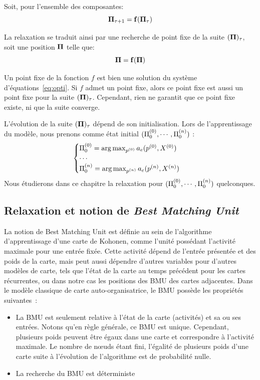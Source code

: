 \documentclass[../main]{subfiles}
\begin{document}
Soit, pour l'ensemble des composantes: 
\begin{equation}
\mathbf{\Pi}_{\tau+1} = \mathbf{f}(\mathbf{\Pi}_\tau)
\end{equation}

La relaxation se traduit ainsi par une recherche de point fixe de la suite $(\mathbf{\Pi})_{\tau}$, soit une position $\mathbf{\Pi}$ telle que:
\begin{equation}
\mathbf{\Pi} = \mathbf{f}(\mathbf{\Pi})
\label{eq:suite}
\end{equation}

Un point fixe de la fonction $f$ est bien une solution du système d'équations~\ref{eq:opti}.
Si $f$ admet un point fixe, alors ce point fixe est aussi un point fixe pour la suite $(\mathbf{\Pi})_\tau$. Cependant, rien ne garantit que ce point fixe existe, ni que la suite converge.

L'évolution de la suite $(\mathbf{\Pi})_{\tau}$ dépend de son initialisation.
Lors de l'apprentissage du modèle, nous prenons comme état initial $(\Pi^{({0})}_0, \cdots , \Pi^{({n})}_0)$ : 
\begin{equation}
\begin{cases}
\Pi^{({0})}_0 = \operatorname*{arg\,max}_{p^{({0})}} a_e(p^{({0})},X^{({0})})\\
\cdots \\
\Pi^{({n})}_0 = \operatorname*{arg\,max}_{p^{({n})}} a_e(p^{({n})},X^{({n})})\\
\end{cases}
\label{eq:init}
\end{equation}
Nous étudierons dans ce chapitre la relaxation pour $(\Pi^{({0})}_0, \cdots , \Pi^{({n})}_0)$ quelconques.

\subsection{Relaxation et notion de \emph{Best Matching Unit}}

La notion de Best Matching Unit est définie au sein de l'algorithme d'apprentissage d'une carte de Kohonen, comme l'unité possédant l'activité maximale pour une entrée fixée. 
Cette activité dépend de l'entrée présentée et des poids de la carte, mais peut aussi dépendre d'autres variables pour d'autres modèles de carte, tels que l'état de la carte au temps précédent pour les cartes récurrentes, ou dans notre cas les positions des BMU des cartes adjacentes.
Dans le modèle classique de carte auto-organisatrice, le BMU possède les propriétés suivantes~:
\begin{itemize}
	\item La BMU est seulement relative à l'état de la carte (activités) et sa ou ses entrées. Notons qu'en règle générale, ce BMU est unique. Cependant, plusieurs poids peuvent être égaux dans une carte et correspondre à l'activité maximale. Le nombre de n\oe{}uds étant fini, l'égalité de plusieurs poids d'une carte suite à l'évolution de l'algorithme est de probabilité nulle.
	\item La recherche du BMU est déterministe
\end{itemize}
\end{document}
